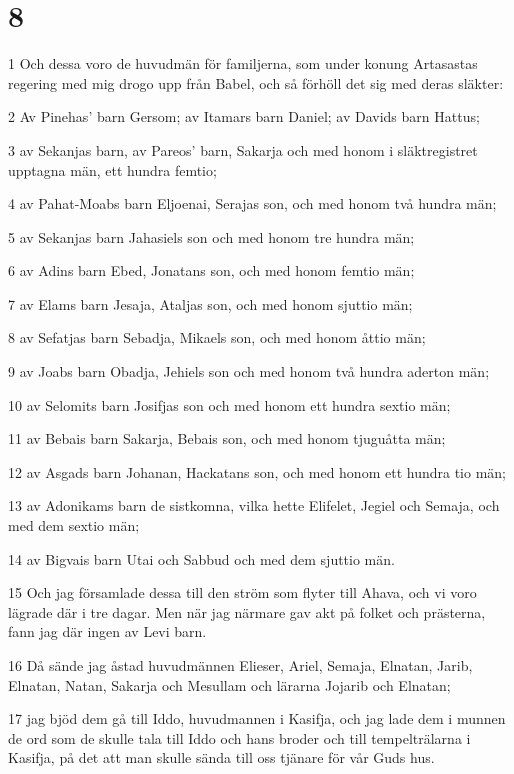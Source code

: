 \chapter{8}

\par 1 Och dessa voro de huvudmän för familjerna, som under konung Artasastas regering med mig drogo upp från Babel, och så förhöll det sig med deras släkter:
\par 2 Av Pinehas' barn Gersom; av Itamars barn Daniel; av Davids barn Hattus;
\par 3 av Sekanjas barn, av Pareos' barn, Sakarja och med honom i släktregistret upptagna män, ett hundra femtio;
\par 4 av Pahat-Moabs barn Eljoenai, Serajas son, och med honom två hundra män;
\par 5 av Sekanjas barn Jahasiels son och med honom tre hundra män;
\par 6 av Adins barn Ebed, Jonatans son, och med honom femtio män;
\par 7 av Elams barn Jesaja, Ataljas son, och med honom sjuttio män;
\par 8 av Sefatjas barn Sebadja, Mikaels son, och med honom åttio män;
\par 9 av Joabs barn Obadja, Jehiels son och med honom två hundra aderton män;
\par 10 av Selomits barn Josifjas son och med honom ett hundra sextio män;
\par 11 av Bebais barn Sakarja, Bebais son, och med honom tjuguåtta män;
\par 12 av Asgads barn Johanan, Hackatans son, och med honom ett hundra tio män;
\par 13 av Adonikams barn de sistkomna, vilka hette Elifelet, Jegiel och Semaja, och med dem sextio män;
\par 14 av Bigvais barn Utai och Sabbud och med dem sjuttio män.
\par 15 Och jag församlade dessa till den ström som flyter till Ahava, och vi voro lägrade där i tre dagar. Men när jag närmare gav akt på folket och prästerna, fann jag där ingen av Levi barn.
\par 16 Då sände jag åstad huvudmännen Elieser, Ariel, Semaja, Elnatan, Jarib, Elnatan, Natan, Sakarja och Mesullam och lärarna Jojarib och Elnatan;
\par 17 jag bjöd dem gå till Iddo, huvudmannen i Kasifja, och jag lade dem i munnen de ord som de skulle tala till Iddo och hans broder och till tempelträlarna i Kasifja, på det att man skulle sända till oss tjänare för vår Guds hus.
